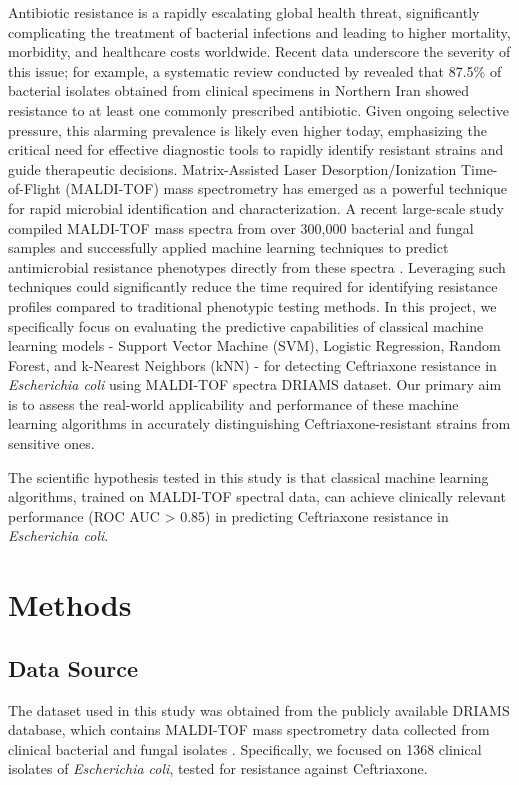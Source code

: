 \documentclass{article}
\begin{document}
Antibiotic resistance is a rapidly escalating global health threat, significantly complicating the treatment of bacterial infections and leading to higher mortality, morbidity, and healthcare costs worldwide. Recent data underscore the severity of this issue; for example, a systematic review conducted by \citet{IranBacteria} revealed that 87.5\% of bacterial isolates obtained from clinical specimens in Northern Iran showed resistance to at least one commonly prescribed antibiotic. Given ongoing selective pressure, this alarming prevalence is likely even higher today, emphasizing the critical need for effective diagnostic tools to rapidly identify resistant strains and guide therapeutic decisions.
Matrix-Assisted Laser Desorption/Ionization Time-of-Flight (MALDI-TOF) mass spectrometry has emerged as a powerful technique for rapid microbial identification and characterization. A recent large-scale study compiled MALDI-TOF mass spectra from over 300,000 bacterial and fungal samples and successfully applied machine learning techniques to predict antimicrobial resistance phenotypes directly from these spectra \citep{datasetExplaination, Astudillo2024}. Leveraging such techniques could significantly reduce the time required for identifying resistance profiles compared to traditional phenotypic testing methods.
In this project, we specifically focus on evaluating the predictive capabilities of classical machine learning models - Support Vector Machine (SVM), Logistic Regression, Random Forest, and k-Nearest Neighbors (kNN) - for detecting Ceftriaxone resistance in \textit{Escherichia coli} using MALDI-TOF spectra DRIAMS dataset. Our primary aim is to assess the real-world applicability and performance of these machine learning algorithms in accurately distinguishing Ceftriaxone-resistant strains from sensitive ones.

The scientific hypothesis tested in this study is that classical machine learning algorithms, trained on MALDI-TOF spectral data, can achieve clinically relevant performance (ROC AUC > 0.85) in predicting Ceftriaxone resistance in \textit{Escherichia coli}.

\section{Methods}

\subsection{Data Source}
The dataset used in this study was obtained from the publicly available DRIAMS database, which contains MALDI-TOF mass spectrometry data collected from clinical bacterial and fungal isolates \citep{datasetExplaination}. Specifically, we focused on 1368 clinical isolates of \textit{Escherichia coli}, tested for resistance against Ceftriaxone.
\end{document}
